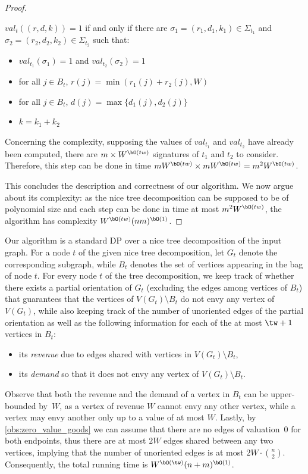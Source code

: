 \documentclass[11pt,letterpaper]{article}
\begin{document}
\begin{proof}
\begin{nestedproof}
    $val_t((r,d,k))=1$ if and only if there are
     $\sigma_1=(r_1,d_1,k_1)\in \Sigma_{t_1}$ and $\sigma_2=(r_2,d_2,k_2)\in \Sigma_{t_2}$ such that:
    \begin{itemize}
        \item $val_{t_1}(\sigma_1)=1$ and $val_{t_2}(\sigma_2)=1$
        \item for all $j\in B_t$, $r(j)=\min(r_1(j)+r_2(j),W)$
        \item for all $j\in B_t$, $d(j)=\max\{d_1(j),d_2(j)\}$
        \item $k=k_1+k_2$
    \end{itemize}

    \end{nestedproof}

    Concerning the complexity, supposing the values of $val_{t_1}$ and $val_{t_2}$ have already been computed, there are $m\times W^{\bO(tw)}$ signatures of $t_1$ and $t_2$ to consider. Therefore, this step can be done in time $m W^{\bO(tw)}\times mW^{\bO(tw)}=m^2 W^{\bO(tw)}$.
    \medskip

    This concludes the description and correctness of our algorithm. We now argue about its complexity: as the nice tree decomposition can be supposed to be of polynomial size and each step can be done in time at most $m^2 W^{\bO(tw)}$, the algorithm has complexity $W^{\bO(tw)}(nm)^{\bO(1)}$.
\end{proof}


\begin{proofsketch}
    Our algorithm is a standard DP over a nice tree decomposition of the input graph.
    For a node $t$ of the given nice tree decomposition, let $G_t$ denote the corresponding subgraph,
    while $B_t$ denotes the set of vertices appearing in the bag of node $t$.
    For every node $t$ of the tree decomposition, we keep track of whether there exists a partial orientation of $G_t$
    (excluding the edges among vertices of $B_t$)
    that guarantees that the vertices of $V(G_t) \setminus B_t$ do not envy any vertex of $V(G_t)$,
    while also keeping track of the number of unoriented edges of the partial orientation
    as well as the following information for each of the at most $\tw+1$ vertices in $B_t$:
    \begin{itemize}
        \item its \emph{revenue} due to edges shared with vertices in $V(G_t) \setminus B_t$,
        \item its \emph{demand} so that it does not envy any vertex of $V(G_t) \setminus B_t$.
    \end{itemize}
    Observe that both the revenue and the demand of a vertex in $B_t$ can be upper-bounded by~$W$,
    as a vertex of revenue $W$ cannot envy any other vertex, while a vertex may envy another only up to a value of at most $W$.
    Lastly, by \cref{obs:zero_value_goods} we can assume that there are no edges of valuation~$0$ for both endpoints,
    thus there are at most $2W$ edges shared between any two vertices, implying that
    the number of unoriented edges is at most $2W \cdot \binom{n}{2}$.
    Consequently, the total running time is $W^{\bO(\tw)} (n+m)^{\bO(1)}$.
\end{proofsketch}
\end{document}
